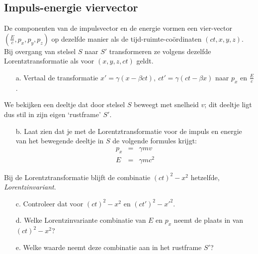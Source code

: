 \subsection{Impuls-energie viervector}\label{Ievv}
De componenten van de impulsvector en de energie vormen een vier-vector
$(\frac{E}{c}, p_{x}, p_{y}, p_{z})$ op dezelfde manier als de 
tijd-ruimte-co\"{o}rdinaten $(ct, x, y, z)$.
Bij overgang van stelsel $S$ naar $S'$ transformeren ze volgens dezelfde 
Lorentztransformatie als voor $(x, y, z, ct)$ geldt.
\begin{itemize}
\item [a.]
Vertaal de transformatie 
$x' = \gamma (x - \beta ct),\ ct' = \gamma (ct - \beta x)$ naar
$p_{x}$ en $\frac{E}{c}$.
\end{itemize}
We bekijken een deeltje dat door stelsel $S$ beweegt met snelheid $v$; dit deeltje ligt dus stil in zijn eigen `rustframe' $S'$.
\begin{itemize}
\item [b.]
Laat zien dat je met de Lorentztransformatie voor de impuls en energie van het
bewegende deeltje in $S$ de volgende formules krijgt:
\begin{eqnarray*}
p_{x} &=& \gamma mv\\
E & = & \gamma mc^{2}
\end{eqnarray*}
\end{itemize}
Bij de Lorentztransformatie blijft de combinatie $(ct)^{2} - x^{2}$
hetzelfde, \textit{Lorentzinvariant}.
\begin{itemize}
\item [c.]
Controleer dat voor $(ct)^{2} - x^{2}$ en $(ct')^{2} - x'^{2}$.
\item [d.]
Welke Lorentzinvariante combinatie van $E$ en $p_{x}$ neemt de plaats in van $(ct)^{2} - x^{2}$?
\item [e.]
Welke waarde neemt deze combinatie aan in het rustframe $S'$?
\end{itemize}

